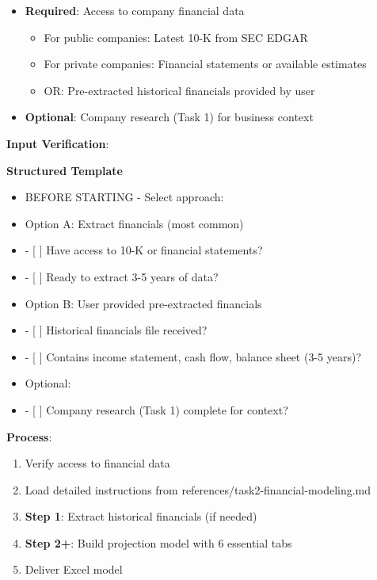 \documentclass[11pt]{article}
\begin{document}
\begin{itemize}[leftmargin=*,itemsep=2pt,topsep=2pt]
\item {} \textbf{Required}: Access to company financial data
\begin{itemize}[leftmargin=*,itemsep=2pt,topsep=2pt]
\item {} For public companies: Latest 10-K from SEC EDGAR
\item {} For private companies: Financial statements or available estimates
\item {} OR: Pre-extracted historical financials provided by user
\end{itemize}
\item {} \textbf{Optional}: Company research (Task 1) for business context
\end{itemize}

\textbf{Input Verification}:

\textbf{Structured Template}
\begin{itemize}[leftmargin=*,itemsep=2pt,topsep=2pt]
\item {} BEFORE STARTING - Select approach:
\item {} Option A: Extract financials (most common)
\item {} - [ ] Have access to 10-K or financial statements?
\item {} - [ ] Ready to extract 3-5 years of data?
\item {} Option B: User provided pre-extracted financials
\item {} - [ ] Historical financials file received?
\item {} - [ ] Contains income statement, cash flow, balance sheet (3-5 years)?
\item {} Optional:
\item {} - [ ] Company research (Task 1) complete for context?
\end{itemize}

\textbf{Process}:

\begin{enumerate}[leftmargin=*,itemsep=2pt,topsep=2pt]
\item {} Verify access to financial data
\item {} Load detailed instructions from references/task2-financial-modeling.md
\item {} \textbf{Step 1}: Extract historical financials (if needed)
\item {} \textbf{Step 2+}: Build projection model with 6 essential tabs
\item {} Deliver Excel model
\end{enumerate}
\end{document}
